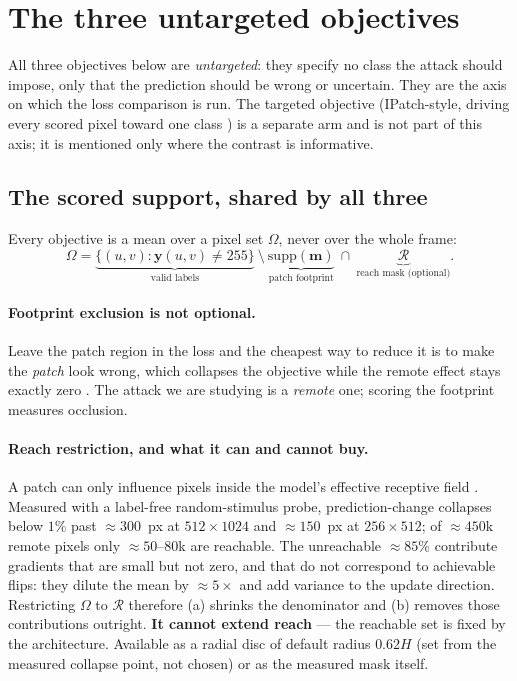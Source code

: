 \documentclass[11pt,a4paper]{article}
\begin{document}
\section{The three untargeted objectives}
\label{sec:losses}

All three objectives below are \emph{untargeted}: they specify no class the
attack should impose, only that the prediction should be wrong or uncertain.
They are the axis on which the loss comparison is run. The targeted
objective (IPatch-style, driving every scored pixel toward one class
\citealp{mirsky2023ipatch}) is a separate arm and is not part of this axis;
it is mentioned only where the contrast is informative.

\subsection{The scored support, shared by all three}
\label{sec:support}

Every objective is a mean over a pixel set $\Omega$, never over the whole
frame:
\begin{equation}
  \Omega = \underbrace{\{(u,v):\mathbf{y}(u,v)\neq255\}}_{\text{valid labels}}
  \ \setminus\ \underbrace{\mathrm{supp}(\mathbf{m})}_{\text{patch footprint}}
  \ \cap\ \underbrace{\mathcal{R}}_{\text{reach mask (optional)}} .
  \label{eq:support}
\end{equation}

\paragraph{Footprint exclusion is not optional.}
Leave the patch region in the loss and the cheapest way to reduce it is to
make the \emph{patch} look wrong, which collapses the objective while the
remote effect stays exactly zero \citep{mirsky2023ipatch}. The attack we are
studying is a \emph{remote} one; scoring the footprint measures occlusion.

\paragraph{Reach restriction, and what it can and cannot buy.}
A patch can only influence pixels inside the model's effective receptive
field \citep{luo2016erf}. Measured with a label-free random-stimulus probe,
prediction-change collapses below $1\%$ past $\approx300$~px at
$512\times1024$ and $\approx150$~px at $256\times512$; of $\approx450$k
remote pixels only $\approx50$--$80$k are reachable. The unreachable
$\approx85\%$ contribute gradients that are small but not zero, and that do
not correspond to achievable flips: they dilute the mean by $\approx5\times$
and add variance to the update direction. Restricting $\Omega$ to
$\mathcal{R}$ therefore (a) shrinks the denominator and (b) removes those
contributions outright. \textbf{It cannot extend reach} --- the reachable
set is fixed by the architecture. Available as a radial disc of default
radius $0.62H$ (set from the measured collapse point, not chosen) or as the
measured mask itself.
\end{document}
